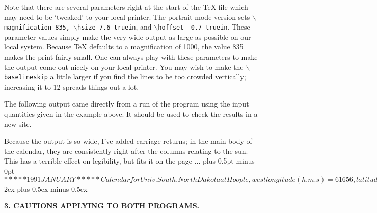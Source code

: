 Note that there are several
parameters right at the start of the TeX file which may need to
be `tweaked' to your local printer.  
The portrait mode version sets {\tt $\backslash$magnification 835,
$\backslash$hsize 7.6 truein}, and {\tt  $\backslash$hoffset -0.7 truein}.  
These parameter values simply
make the very wide output as large 
as possible on our local system.   Because TeX defaults to a magnification
of 1000, the value 835 makes the print fairly small.
One can always play with these parameters to make the output come
out nicely on your local printer.
You may wish to make the {\tt  $\backslash$baselineskip} a little larger if you
find the lines to be too crowded vertically; increasing it to
12 spreads things out a lot. 


The following output came directly from a run of the program using
the input quantities given in the example above.  It should be used
to check the results in a new site.  

Because the output is so wide, I've added carriage returns; in the 
main body of the calendar, they are consistently right after the
columns relating to the sun.  This has a terrible effect on legibility, 
but fits it on the page $\ldots$
\parskip 0pt plus 0.5pt minus 0pt
\verbatim$

                                        ***** 1991 JANUARY *****

Calendar for Univ. South. North Dakota at Hoople, west longitude 
(h.m.s) = 6 16 56, latitude (d.m) =  44 44.7
Note that each line lists events of one night, spanning two calendar 
dates.  Rise/set times are given
in Central time (  6 hr W), uncorrected for elevation, DAYLIGHT time 
used, * shows night clocks are reset.
Moon coords. and illum. are for local midnight, even if moon is down.  
Program: John Thorstensen, Dartmouth College.

  Date (eve/morn)      JDmid    LMSTmidn   ---------- Sun: ---------   
LST twilight:  ------------- Moon: --------------
  (1991 at start)    (-2440000)            set  twi.end twi.beg rise
    eve    morn    rise   set  %

Tue Jan 01/Wed Jan 02  8258.8    6 28 34   16 47  18 33   6 09  7 54
    1 00  12 38   18 08  .....    97   8 17.7  18 56
Wed Jan 02/Thu Jan 03  8259.8    6 32 31   16 48  18 33   6 09  7 54
    1 05  12 42   19 29  .....    91   9 15.5  13 45
Thu Jan 03/Fri Jan 04  8260.8    6 36 28   16 49  18 34   6 09  7 54
    1 10  12 46   20 47  .....    83  10 08.9   7 58
$
\parskip 2ex plus 0.5ex minus 0.5ex
\bigskip 	
\centerline{\bf 3. CAUTIONS APPLYING TO BOTH PROGRAMS.}

